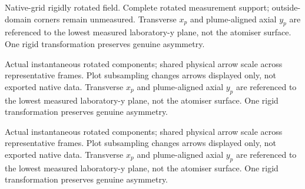 \caption{Native-grid rigidly rotated field. Complete rotated measurement support; outside-domain corners remain unmeasured. Transverse $x_p$ and plume-aligned axial $y_p$ are referenced to the lowest measured laboratory-y plane, not the atomiser surface. One rigid transformation preserves genuine asymmetry.}

\caption{Actual instantaneous rotated components; shared physical arrow scale across representative frames. Plot subsampling changes arrows displayed only, not exported native data. Transverse $x_p$ and plume-aligned axial $y_p$ are referenced to the lowest measured laboratory-y plane, not the atomiser surface. One rigid transformation preserves genuine asymmetry.}

\caption{Actual instantaneous rotated components; shared physical arrow scale across representative frames. Plot subsampling changes arrows displayed only, not exported native data. Transverse $x_p$ and plume-aligned axial $y_p$ are referenced to the lowest measured laboratory-y plane, not the atomiser surface. One rigid transformation preserves genuine asymmetry.}
